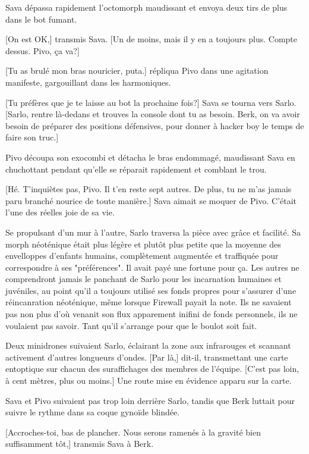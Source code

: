 Sava dépassa rapidement l'octomorph maudissant et envoya deux tirs de plus dans le bot fumant. 

[On est OK,] transmis Sava. [Un de moins, mais il y en a toujours plus. Compte dessus. Pivo, ça va?] 

[Tu as brulé mon bras nouricier, puta.] répliqua Pivo dans une agitation manifeste, gargouillant dans les harmoniques. 

[Tu préfères que je te laisse au bot la prochaine fois?] Sava se tourna vers Sarlo. [Sarlo, rentre là-dedans et trouves la console dont tu as besoin. Berk, on va avoir besoin de préparer des positions défensives, pour donner à hacker boy le temps de faire son truc.] 

Pivo découpa son exocombi et détacha le bras endommagé, maudissant Sava en chuchottant pendant qu'elle se réparait rapidement et comblant le trou. 

[Hé. T'inquiètes pas, Pivo. Il t'en reste sept autres. De plus, tu ne m'as jamais paru branché nourice de toute manière.] Sava aimait se moquer de Pivo. C'était l'une des réelles joie de sa vie. 

Se propulsant d'un mur à l'autre, Sarlo traversa la pièce avec grâce et facilité. Sa morph néoténique était plus légère et plutôt plus petite que la moyenne des envelloppes d'enfants humains, complètement augmentée et traffiquée pour correspondre à ses "préférences". Il avait payé une fortune pour ça. Les autres ne comprendront jamais le panchant de Sarlo pour les incarnation humaines et juvéniles, au point qu'il a toujours utilisé ses fonds propres pour s'assurer d'une réincanration néoténique, même lorsque Firewall payait la note. Ils ne savaient pas non plus d'où venanit son flux apparement inifini de fonds personnels, ils ne voulaient pas savoir. Tant qu'il s'arrange pour que le boulot soit fait. 

Deux minidrones suivaient Sarlo, éclairant la zone aux infrarouges et scannant activement d'autres longueurs d'ondes. [Par là,] dit-il, transmettant une carte entoptique sur chacun des suraffichages des membres de l'équipe. [C'est pas loin, à cent mètres, plus ou moins.] Une route mise en évidence apparu sur la carte. 

Sava et Pivo suivaient pas trop loin derrière Sarlo, tandis que Berk luttait pour suivre le rythme dans sa coque gynoïde blindée. 

[Accroches-toi, bas de plancher. Nous serons ramenés à la gravité bien suffisamment tôt,] transmis Sava à Berk. 

